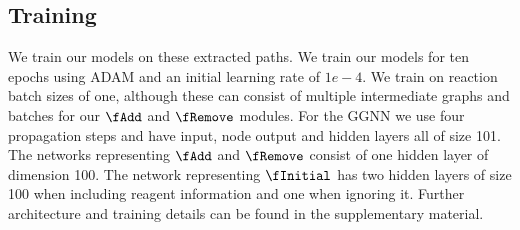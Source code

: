 \subsection{Training}

We train our models on these extracted paths. 
We train our models for ten epochs using ADAM \citep{kingma2014adam} and an initial learning rate of $1e-4$.
We train on reaction batch sizes of one, although these can consist of multiple intermediate graphs and batches for our $\fAdd$ and  $\fRemove$ modules.
For the GGNN we use four propagation steps and have input, node output and hidden layers all of size 101. 
The networks representing $\fAdd$ and  $\fRemove$ consist of one hidden layer of dimension 100. 
The network representing $\fInitial$ has two hidden layers of size 100 when including  reagent information and one when ignoring it.
Further architecture and training details can be found in the supplementary material.